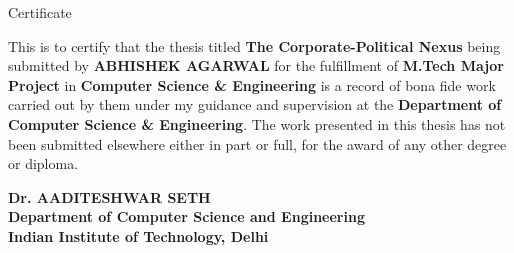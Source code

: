 \begin{center}
\LARGE{ Certificate} 
\end{center}

\vspace{0.5in}

This is to certify that the thesis titled {\bfseries The Corporate-Political Nexus} being submitted by
{\bfseries ABHISHEK AGARWAL} for the fulfillment of {\bfseries M.Tech Major Project} in {\bfseries Computer Science \& Engineering} is a record of bona fide work carried out by them under my guidance and supervision at the {\bfseries Department of Computer Science \& Engineering}. The work presented in this thesis has not been submitted elsewhere either in part or full, for the award of any other degree or diploma.

\vspace{1.5in}


{\bfseries Dr. AADITESHWAR SETH} \\
{\bfseries Department of Computer Science and Engineering} \\
{\bfseries Indian Institute of Technology, Delhi}\\ 
